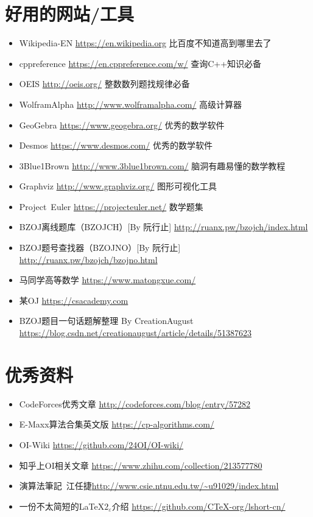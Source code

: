 \section{好用的网站/工具}
\begin{itemize}
    \item Wikipedia-EN \url{https://en.wikipedia.org} 比百度不知道高到哪里去了
    \item cppreference \url{https://en.cppreference.com/w/} 查询C++知识必备
    \item OEIS \url{http://oeis.org/} 整数数列题找规律必备
    \item WolframAlpha \url{http://www.wolframalpha.com/} 高级计算器
    \item GeoGebra \url{https://www.geogebra.org/} 优秀的数学软件
    \item Desmos \url{https://www.desmos.com/} 优秀的数学软件
    \item 3Blue1Brown \url{http://www.3blue1brown.com/} 脑洞有趣易懂的数学教程
    \item Graphviz \url{http://www.graphviz.org/} 图形可视化工具
    \item Project~Euler \url{https://projecteuler.net/} 数学题集
    \item BZOJ离线题库（BZOJCH）[By 阮行止] \url{http://ruanx.pw/bzojch/index.html}
    \item BZOJ题号查找器（BZOJNO）[By 阮行止]
    \url{http://ruanx.pw/bzojch/bzojno.html}
    \item 马同学高等数学 \url{https://www.matongxue.com/}
    \item 某OJ \url{https://csacademy.com}
    \item BZOJ题目一句话题解整理 By CreationAugust\\\url{https://blog.csdn.net/creationaugust/article/details/51387623}
\end{itemize}
\section{优秀资料}
\begin{itemize}
    \item CodeForces优秀文章 \url{http://codeforces.com/blog/entry/57282}
    \item E-Maxx算法合集英文版 \url{https://cp-algorithms.com/}
    \item OI-Wiki \url{https://github.com/24OI/OI-wiki/}
    \item 知乎上OI相关文章 \url{https://www.zhihu.com/collection/213577780}
    \item 演算法筆記~江任捷\url{http://www.csie.ntnu.edu.tw/\~u91029/index.html}
    \item 一份不太简短的\LaTeX{}$2_{\varepsilon}$介绍
    \url{https://github.com/CTeX-org/lshort-cn/}
\end{itemize}
